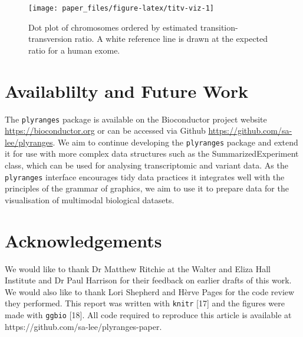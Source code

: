 \documentclass[10pt,letterpaper]{article}
\newenvironment{Shaded}{\begin{snugshade}}{\end{snugshade}}
\newcommand{\DataTypeTok}[1]{\textcolor[rgb]{0.13,0.29,0.53}{#1}}
\newcommand{\KeywordTok}[1]{\textcolor[rgb]{0.13,0.29,0.53}{\textbf{#1}}}
\newcommand{\NormalTok}[1]{#1}
\newcommand{\OperatorTok}[1]{\textcolor[rgb]{0.81,0.36,0.00}{\textbf{#1}}}
\newcommand{\StringTok}[1]{\textcolor[rgb]{0.31,0.60,0.02}{#1}}
\begin{document}
\begin{Shaded}
\end{Shaded}

\begin{figure}

{\centering \texttt{[image: paper\_files/figure-latex/titv-viz-1]} 

}

\caption{Dot plot of chromosomes ordered by estimated transition-transversion ratio. A white reference line is drawn at the expected ratio for a human exome.}\label{fig:titv-viz}
\end{figure}

\hypertarget{availablilty-and-future-work}{%
\section{Availablilty and Future
Work}\label{availablilty-and-future-work}}

The \texttt{plyranges} package is available on the Bioconductor project
website \url{https://bioconductor.org} or can be accessed via Github
\url{https://github.com/sa-lee/plyranges}. We aim to continue developing
the \texttt{plyranges} package and extend it for use with more complex
data structures such as the SummarizedExperiment class, which can be
used for analysing transcriptomic and variant data. As the
\texttt{plyranges} interface encourages tidy data practices it
integrates well with the principles of the grammar of graphics, we aim
to use it to prepare data for the visualisation of multimodal biological
datasets.

\hypertarget{acknowledgements}{%
\section{Acknowledgements}\label{acknowledgements}}

We would like to thank Dr Matthew Ritchie at the Walter and Eliza Hall
Institute and Dr Paul Harrison for their feedback on earlier drafts of
this work. We would also like to thank Lori Shepherd and Hèrve Pages for
the code review they performed. This report was written with
\texttt{knitr} {[}17{]} and the figures were made with \texttt{ggbio}
{[}18{]}. All code required to reproduce this article is available at
https://github.com/sa-lee/plyranges-paper.
\end{document}
